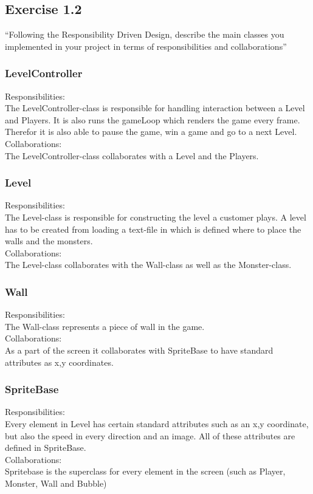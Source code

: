 \subsection{Exercise 1.2}
``Following the Responsibility Driven Design, describe the main classes you implemented in your project in terms of responsibilities and collaborations''

\subsubsection{LevelController}
Responsibilities: \\
The LevelController-class is responsible for handling interaction between a Level and Players. It is also runs the gameLoop which renders the game every frame. Therefor it is also able to pause the game, win a game and go to a next Level. \\
Collaborations: \\
The LevelController-class collaborates with a Level and the Players. 

\subsubsection{Level}
Responsibilities: \\
The Level-class is responsible for constructing the level a customer plays. A level has to be created from loading a text-file in which is defined where to place the walls and the monsters. \\
Collaborations: \\
The Level-class collaborates with the Wall-class as well as the Monster-class. 

\subsubsection{Wall}
Responsibilities: \\
The Wall-class represents a piece of wall in the game. \\
Collaborations: \\
As a part of the screen it collaborates with SpriteBase to have standard attributes as x,y coordinates. 

\subsubsection{SpriteBase}
Responsibilities: \\
Every element in Level has certain standard attributes such as an x,y coordinate, but also the speed in every direction and an image. All of these attributes are defined in SpriteBase. \\
Collaborations: \\
Spritebase is the superclass for every element in the screen (such as Player, Monster, Wall and Bubble)

